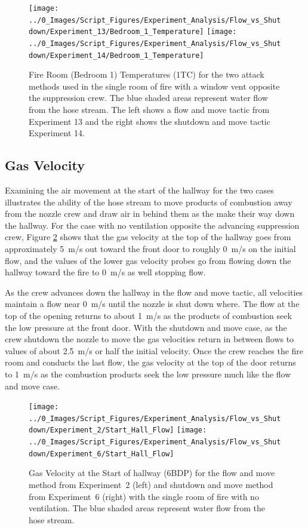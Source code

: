 \documentclass[12pt,oneside]{book}
\begin{document}
\begin{figure}[H]
\centering
\texttt{[image: ../0\_Images/Script\_Figures/Experiment\_Analysis/Flow\_vs\_Shutdown/Experiment\_13/Bedroom\_1\_Temperature]}
\texttt{[image: ../0\_Images/Script\_Figures/Experiment\_Analysis/Flow\_vs\_Shutdown/Experiment\_14/Bedroom\_1\_Temperature]}
\caption[Bedroom 1 Temp. - Two Vent - Flow \& Move vs. Shutdown \& Move]{Fire Room (Bedroom 1) Temperatures (1TC) for the two attack methods used in the single room of fire with a window vent opposite the suppression crew. The blue shaded areas represent water flow from the hose stream. The left shows a flow and move tactic from Experiment 13 and the right shows the shutdown and move tactic Experiment 14.}
\label{fig:Flow_vs_Shut_Two_Vent_Fire_Temp}
\end{figure}

\subsection{Gas Velocity}
Examining the air movement at the start of the hallway for the two cases illustrates the ability of the hose stream to move products of combustion away from the nozzle crew and draw air in behind them as the make their way down the hallway. For the case with no ventilation opposite the advancing suppression crew, Figure \ref{fig:Flow_vs_Shut_Single_No_Vent_Velocity} shows that the gas velocity at the top of the hallway goes from approximately 5~m/s out toward the front door to roughly 0~m/s on the initial flow, and the values of the lower gas velocity probes go from flowing down the hallway toward the fire to 0~m/s as well stopping flow. 

As the crew advances down the hallway in the flow and move tactic, all velocities maintain a flow near 0~m/s until the nozzle is shut down where. The flow at the top of the opening returns to about 1~m/s as the products of combustion seek the low pressure at the front door.  With the shutdown and move case, as the crew shutdown the nozzle to move the gas velocities return in between flows to values of about 2.5~m/s or half the initial velocity. Once the crew reaches the fire room and conducts the last flow, the gas velocity at the top of the door returns to 1~m/s as the combustion products seek the low pressure much like the flow and move case.

\begin{figure}[H]
\centering
\texttt{[image: ../0\_Images/Script\_Figures/Experiment\_Analysis/Flow\_vs\_Shutdown/Experiment\_2/Start\_Hall\_Flow]}
\texttt{[image: ../0\_Images/Script\_Figures/Experiment\_Analysis/Flow\_vs\_Shutdown/Experiment\_6/Start\_Hall\_Flow]}
\caption[Airflow - No Vent - Flow \& Move vs. Shutdown \& Move]{Gas Velocity at the Start of hallway (6BDP) for the flow and move method from Experiment~2 (left) and shutdown and move method from Experiment~6 (right) with the single room of fire with no ventilation. The blue shaded areas represent water flow from the hose stream.}
\label{fig:Flow_vs_Shut_Single_No_Vent_Velocity}
\end{figure}
\end{document}
